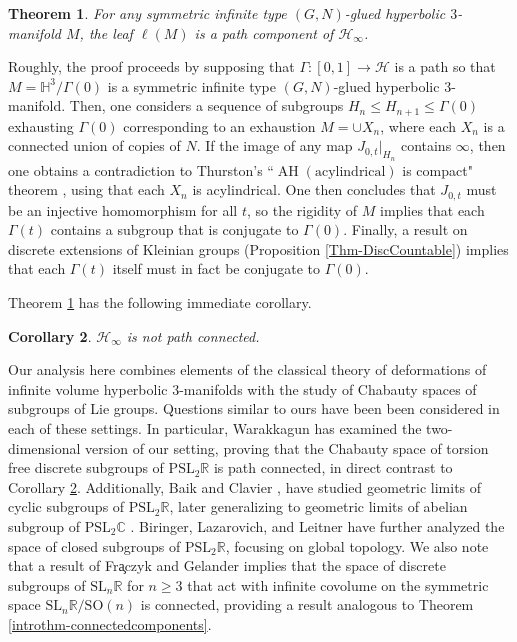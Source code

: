 \documentclass[11pt,leqno]{article}
\DeclareMathOperator{\AH}{AH}
\newtheorem{introtheorem}{Theorem}
\newtheorem{intromaincor}[introtheorem]{Corollary}
\theoremstyle{introdef}
\numberwithin{lemma}{section}
\theoremstyle{definition}
\newcommand{\R}{\mathbb{R}}
\newcommand{\C}{\mathbb{C}}
\begin{document}
\begin{introtheorem}
    \label{introthm-GGluePathComp}
    For any symmetric infinite type $(G,N)$-glued hyperbolic $3$-manifold $M$, the leaf $\ell(M)$ is a path component of $\mathcal{H}_\infty$.
\end{introtheorem}

Roughly, the proof proceeds by supposing that $\Gamma:[0,1]\rightarrow\mathcal{H}$ is a path so that $M=\mathbb{H}^3/\Gamma(0)$ is a symmetric infinite type $(G,N)$-glued hyperbolic $3$-manifold. Then, one considers a sequence of subgroups $H_n\leq H_{n+1}\leq\Gamma(0)$ exhausting $\Gamma(0)$ corresponding to an exhaustion $M=\cup X_n$, where each $X_n$ is a connected union of copies of $N$. If the image of any map $J_{0,t}|_{H_n}$ contains $\infty$, then one obtains a contradiction to Thurston's ``$\AH(\text{acylindrical})$ is compact" theorem \cite{THUI}, using that each $X_n$ is acylindrical. One then concludes that $J_{0,t}$ must be an injective homomorphism for all $t$, so the rigidity of $M$ implies that each $\Gamma(t)$ contains a subgroup that is conjugate to $\Gamma(0)$. Finally, a result on discrete extensions of Kleinian groups (Proposition \ref{Thm-DiscCountable}) implies that each $\Gamma(t)$ itself must in fact be conjugate to $\Gamma(0)$.\par

Theorem \ref{introthm-GGluePathComp} has the following immediate corollary.

\begin{intromaincor}
\label{introcor-notpathconn}
    $\mathcal{H}_\infty$ is not path connected.
\end{intromaincor}

Our analysis here combines elements  of the classical theory of deformations of infinite volume hyperbolic $3$-manifolds with the study of Chabauty spaces of subgroups of Lie groups. Questions similar to ours have been been considered in each of these settings. In particular, Warakkagun \cite{WAR} has examined the two-dimensional version of our setting, proving that the Chabauty space of torsion free discrete subgroups of $\mathrm{PSL}_2\R$ is path connected, in direct contrast to Corollary \ref{introcor-notpathconn}. Additionally, Baik and Clavier \cite{BAIK}, have studied geometric limits of cyclic subgroups of $\mathrm{PSL}_2\R$, later generalizing to geometric limits of abelian subgroup of $\mathrm{PSL}_2\C$ \cite{BAIK2}. Biringer, Lazarovich, and Leitner \cite{IANCHAB} have further analyzed the space of closed subgroups of $\mathrm{PSL}_2\R$, focusing on global topology. We also note that a result of Fr\c{a}czyk and Gelander \cite{FRAGEL} implies that the space of discrete subgroups of $\mathrm{SL}_n\R$ for $n\geq 3$ that act with infinite covolume on the symmetric space $\mathrm{SL}_n\R/\mathrm{SO}(n)$ is connected, providing a result analogous to Theorem \ref{introthm-connectedcomponents}.\par\par
\end{document}
